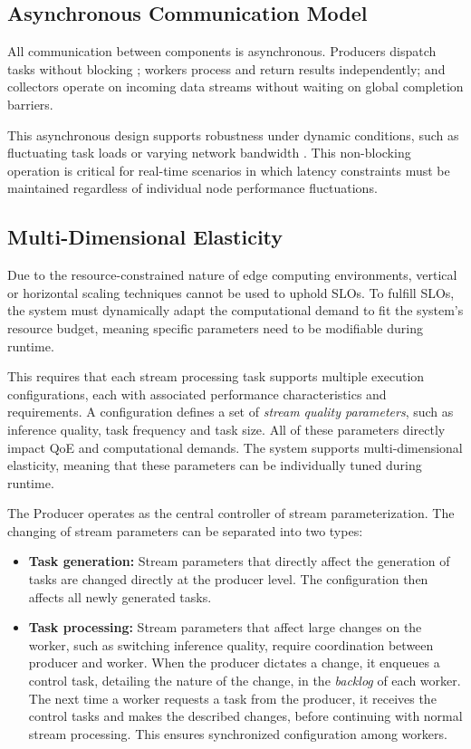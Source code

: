 \subsection{Asynchronous Communication Model}
All communication between components is asynchronous. Producers dispatch tasks without blocking \cite{lauener_how_2018}; workers process and return results independently; and collectors operate on incoming data streams without waiting on global completion barriers.

This asynchronous design supports robustness under dynamic conditions, such as fluctuating task loads or varying network bandwidth \cite{nguyen_octopinf_2025}. This non-blocking operation is critical for real-time scenarios in which latency constraints must be maintained regardless of individual node performance fluctuations.


\subsection{Multi-Dimensional Elasticity}
Due to the resource-constrained nature of edge computing environments, vertical or horizontal scaling techniques cannot be used to uphold SLOs. To fulfill SLOs, the system must dynamically adapt the computational demand to fit the system's resource budget, meaning specific parameters need to be modifiable during runtime.

This requires that each stream processing task supports multiple execution configurations, each with associated performance characteristics and requirements. A configuration defines a set of \textit{stream quality parameters}, such as inference quality, task frequency and task size. All of these parameters directly impact QoE and computational demands. The system supports multi-dimensional elasticity, meaning that these parameters can be individually tuned during runtime.

The Producer operates as the central controller of stream parameterization. The changing of stream parameters can be separated into two types:

\begin{itemize}
    \item \textbf{Task generation:} Stream parameters that directly affect the generation of tasks are changed directly at the producer level. The configuration then affects all newly generated tasks.
    \item \textbf{Task processing:} Stream parameters that affect large changes on the worker, such as switching inference quality, require coordination between producer and worker. When the producer dictates a change, it enqueues a control task, detailing the nature of the change, in the \textit{backlog}\label{def:backlog} of each worker. The next time a worker requests a task from the producer, it receives the control tasks and makes the described changes, before continuing with normal stream processing. This ensures synchronized configuration among workers.
\end{itemize}

